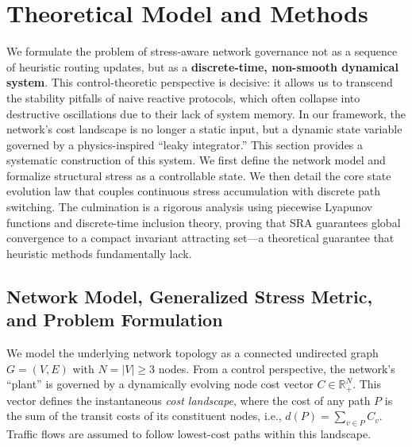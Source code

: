 \documentclass[journal]{IEEEtran}
\theoremstyle{plain}
\theoremstyle{definition}
\newcommand{\rev}[1]{{\color{blue}#1}}
\begin{document}
\section{Theoretical Model and Methods}
\label{sec:model}

We formulate the problem of stress-aware network governance not as a sequence of heuristic routing updates, but as a \textbf{discrete-time, non-smooth dynamical system}. 
This control-theoretic perspective is decisive: it allows us to transcend the stability pitfalls of naive reactive protocols, which often collapse into destructive oscillations due to their lack of system memory.
In our framework, the network's cost landscape is no longer a static input, but a dynamic state variable governed by a physics-inspired ``leaky integrator.''
This section provides a systematic construction of this system. 
We first define the network model and formalize structural stress as a controllable state. 
We then detail the core state evolution law that couples continuous stress accumulation with discrete path switching. 
The culmination is a rigorous analysis using piecewise Lyapunov functions and discrete-time inclusion theory, proving that SRA guarantees global convergence to a \rev{compact invariant attracting set}---a theoretical guarantee that heuristic methods fundamentally lack.

\subsection{Network Model, \rev{Generalized Stress Metric, and Problem Formulation}}

We model the underlying network topology as a connected undirected graph $G=(V,E)$ with $N=|V| \ge 3$ nodes. 
From a control perspective, the network's ``plant'' is governed by a dynamically evolving node cost vector $C \in \mathbb{R}^N_+$. 
This vector defines the instantaneous \textit{cost landscape}, where the cost of any path $P$ is the sum of the transit costs of its constituent nodes, i.e., $d(P) = \sum_{v \in P} C_v$. 
Traffic flows are assumed to follow lowest-cost paths within this landscape.
\end{document}
